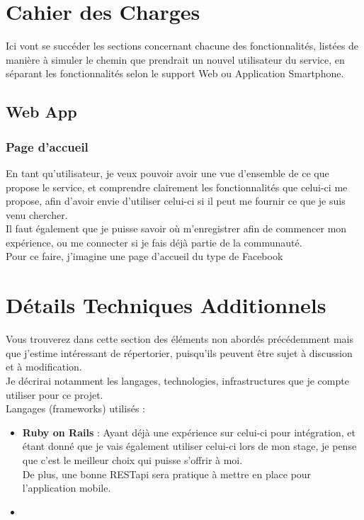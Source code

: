 \documentclass[a4paper,10pt,final,fleqn]{article}
\begin{document}
	\section{Cahier des Charges}

		Ici vont se succéder les sections concernant chacune des fonctionnalités, listées de manière à simuler le chemin que prendrait un nouvel utilisateur du service, en séparant les fonctionnalités selon le support Web ou Application Smartphone.\\

		\subsection{Web App}

			\subsubsection{Page d'accueil}

				En tant qu'utilisateur, je veux pouvoir avoir une vue d'ensemble de ce que propose le service, et comprendre clairement les fonctionnalités que celui-ci me propose, afin d'avoir envie d'utiliser celui-ci si il peut me fournir ce que je suis venu chercher.\\
				Il faut également que je puisse savoir où m'enregistrer afin de commencer mon expérience, ou me connecter si je fais déjà partie de la communauté.\\

				Pour ce faire, j'imagine une page d'accueil du type de Facebook

	\section{Détails Techniques Additionnels}

		Vous trouverez dans cette section des éléments non abordés précédemment mais que j'estime intéressant de répertorier, puisqu'ils peuvent être sujet à discussion et à modification.\\
		Je décrirai notamment les langages, technologies, infrastructures que je compte utiliser pour ce projet.\\

		Langages (frameworks) utilisés : \\

		\begin{itemize}
			\item \textbf{Ruby on Rails} : Ayant déjà une expérience sur celui-ci pour intégration, et étant donné que je vais également utiliser celui-ci lors de mon stage, je pense que c'est le meilleur choix qui puisse s'offrir à moi.\\
			De plus, une bonne RESTapi sera pratique à mettre en place pour l'application mobile.\\

			 \item \textbf{}
		\end{itemize}
\end{document}
